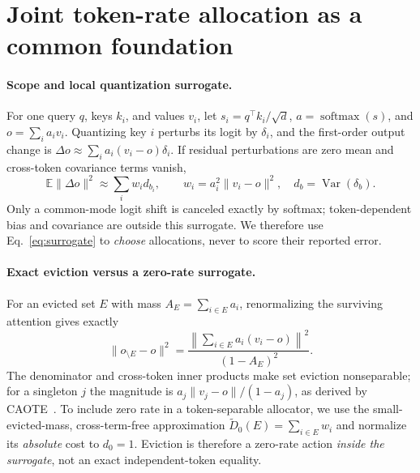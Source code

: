 \documentclass{article}
\theoremstyle{definition}
\begin{document}
\section{Joint token-rate allocation as a common foundation}
\label{sec:framework}

\paragraph{Scope and local quantization surrogate.}
For one query $q$, keys $k_i$, and values $v_i$, let
$s_i=q^\top k_i/\sqrt d$, $a=\operatorname{softmax}(s)$, and
$o=\sum_i a_i v_i$.  Quantizing key $i$ perturbs its logit by $\delta_i$, and the first-order output change is $\Delta o \approx \sum_i a_i(v_i-o)\delta_i$.
If residual perturbations are zero mean and cross-token covariance terms vanish,
\begin{equation}
  \mathbb E\|\Delta o\|^2
  \approx \sum_i w_i d_{b_i}, \qquad
  w_i=a_i^2\|v_i-o\|^2,\quad d_b=\operatorname{Var}(\delta_b).
  \label{eq:surrogate}
\end{equation}
Only a common-mode logit shift is canceled exactly by softmax; token-dependent bias and covariance are outside this surrogate.  We therefore use Eq.~\ref{eq:surrogate} to \emph{choose} allocations, never to score their reported error.

\paragraph{Exact eviction versus a zero-rate surrogate.}
For an evicted set $E$ with mass $A_E=\sum_{i\in E}a_i$, renormalizing the surviving attention gives exactly
\begin{equation}
 \|o_{\setminus E}-o\|^2
 =\frac{\left\|\sum_{i\in E}a_i(v_i-o)\right\|^2}{(1-A_E)^2}.
 \label{eq:exact-eviction}
\end{equation}
The denominator and cross-token inner products make set eviction nonseparable; for a singleton $j$ the magnitude is $a_j\|v_j-o\|/(1-a_j)$, as derived by CAOTE~\citep{goel2025caote}.
To include zero rate in a token-separable allocator, we use the small-evicted-mass, cross-term-free approximation
$\widetilde D_0(E)=\sum_{i\in E}w_i$ and normalize its \emph{absolute} cost to $d_0=1$.  Eviction is therefore a zero-rate action \emph{inside the surrogate}, not an exact independent-token equality.
\end{document}
